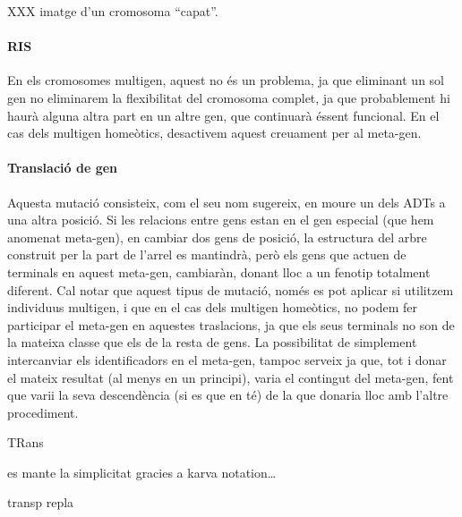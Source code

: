 \documentclass[titlepage,a4paper,12pt]{book}
\begin{document}
XXX imatge d'un cromosoma ``capat''.

\paragraph{RIS} %
\label{par:RIS}
En els cromosomes multigen, aquest no és un problema, ja que eliminant un sol
gen no eliminarem la flexibilitat del cromosoma complet, ja que probablement hi
haurà alguna altra part en un altre gen, que continuarà éssent funcional.  En el
cas dels multigen homeòtics, desactivem aquest creuament per al meta-gen.

\paragraph{Translació de gen} %
\label{par:Translacio de gen}

Aquesta mutació consisteix, com el seu nom sugereix, en moure un dels ADTs a una
altra posició.  Si les relacions entre gens estan en el gen especial (que hem
anomenat meta-gen), en cambiar dos gens de posició, la estructura del arbre
construit per la part de l'arrel es mantindrà, però els gens que actuen de
terminals en aquest meta-gen, cambiaràn, donant lloc a un fenotip totalment
diferent.  Cal notar que aquest tipus de mutació, només es pot aplicar si
utilitzem individuus multigen, i que en el cas dels multigen homeòtics, no podem
fer participar el meta-gen en aquestes traslacions, ja que els seus terminals no
son de la mateixa classe que els de la resta de gens.  La possibilitat de
simplement intercanviar els identificadors en el meta-gen, tampoc serveix ja
que, tot i donar el mateix resultat (al menys en un principi), varia el
contingut del meta-gen, fent que varii la seva descendència (si es que en té) de
la que donaria lloc amb l'altre procediment.

TRans

es mante la simplicitat gracies a karva notation\ldots

transp
repla


\end{document}
